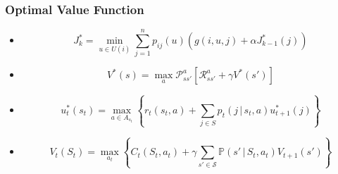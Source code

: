 \documentclass{article}
\newcommand{\set}[1]{\left\{#1\right\}}
\newcommand{\parens}[1]{\left(#1\right)}
\newcommand{\bra}[1]{\left[#1\right]}
\newcommand{\g}{\,|\,}
\begin{document}
\subsubsection*{Optimal Value Function} %
\label{ssub:optimal_value_function}
\begin{itemize}
	\item 
		\citet{bertsekas2007dynamic}
		\[
			J_{k}^{*}=\min_{u\in U(i)}\sum_{j=1}^{n}p_{ij}(u)\parens{g(i,u,j)+\alpha J^{*}_{k-1}(j)}
		\]
	\item 
	\citet{sutton1998reinforcement}
		\[
			V^{*}(s)=\max_{a}\mathcal{P}^{a}_{ss'}\bra{\mathcal{R}^{a}_{ss'}+\gamma V^{*}(s')}
		\]
	\item 
	\citet{puterman1994markov}
		\[
			u_{t}^{*}(s_{t})=\max_{a\in A_{s_{t}}}\set{r_{t}(s_{t},a)+\sum_{j\in S}p_{t}(j\g s_{t},a)u_{t+1}^{*}(j)}
		\]
	\item 
	\citet{powell2011approximate}
		\[
			V_{t}(S_{t})=\max_{a_{t}}\set{C_{t}(S_{t},a_{t})+\gamma\sum_{s'\in \mathcal{S}}\mathbb{P}(s'\g S_{t},a_{t})V_{t+1}(s')}
		\]
\end{itemize}



  
\end{document}
